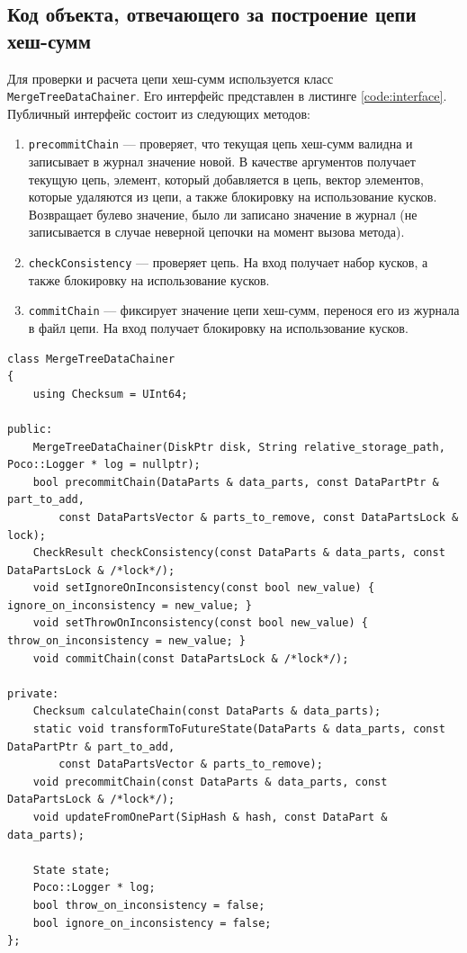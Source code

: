 \subsection{Код объекта, отвечающего за построение цепи хеш-сумм}

Для проверки и расчета цепи хеш-сумм используется класс \\ \texttt{MergeTreeDataChainer}. Его интерфейс представлен в листинге \ref{code:interface}. Публичный интерфейс состоит из следующих методов:
\begin{enumerate}
    \item \texttt{precommitChain} --- проверяет, что текущая цепь хеш-сумм валидна и записывает в журнал значение новой. В качестве аргументов получает текущую цепь, элемент, который добавляется в цепь, вектор элементов, которые удаляются из цепи, а также блокировку на использование кусков. Возвращает булево значение, было ли записано значение в журнал (не записывается в случае неверной цепочки на момент вызова метода).
    \item \texttt{checkConsistency} --- проверяет цепь. На вход получает набор кусков, а также блокировку на использование кусков.
    \item \texttt{commitChain} --- фиксирует значение цепи хеш-сумм, перенося его из журнала в файл цепи. На вход получает блокировку на использование кусков.
\end{enumerate}

\pagebreak

\begin{lstlisting}[label=code:interface, caption={Класс \texttt{MergeTreeDataChainer}.}]
class MergeTreeDataChainer
{
    using Checksum = UInt64;

public:
    MergeTreeDataChainer(DiskPtr disk, String relative_storage_path, Poco::Logger * log = nullptr);
    bool precommitChain(DataParts & data_parts, const DataPartPtr & part_to_add,
        const DataPartsVector & parts_to_remove, const DataPartsLock & lock);
    CheckResult checkConsistency(const DataParts & data_parts, const DataPartsLock & /*lock*/);
    void setIgnoreOnInconsistency(const bool new_value) { ignore_on_inconsistency = new_value; }
    void setThrowOnInconsistency(const bool new_value) { throw_on_inconsistency = new_value; }
    void commitChain(const DataPartsLock & /*lock*/);

private:
    Checksum calculateChain(const DataParts & data_parts);
    static void transformToFutureState(DataParts & data_parts, const DataPartPtr & part_to_add,
        const DataPartsVector & parts_to_remove);
    void precommitChain(const DataParts & data_parts, const DataPartsLock & /*lock*/);
    void updateFromOnePart(SipHash & hash, const DataPart & data_parts);

    State state;
    Poco::Logger * log;
    bool throw_on_inconsistency = false;
    bool ignore_on_inconsistency = false;
};
\end{lstlisting}

